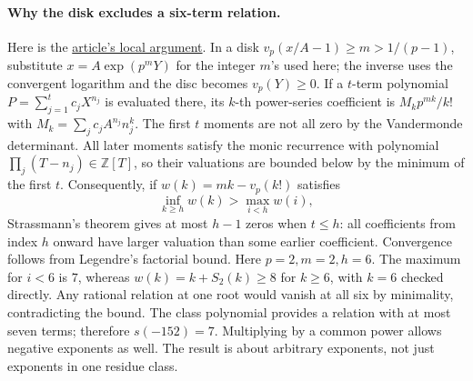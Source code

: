 \documentclass[11pt]{article}
\newcommand{\Z}{\mathbb Z}
\begin{document}
\paragraph{Why the disk excludes a six-term relation.}
Here is the \href{https://github.com/VladimirReshetnikov/ProveIt/blob/e7f7a226563fb14c6f0b796322e43b048c548953/Analysis/GeneralizedRiemannHypothesis/Article/sections/smd.tex#L64-L109}{article's local argument}.
In a disk \(v_p(x/A-1)\ge m>1/(p-1)\), substitute
\(x=A\exp(p^mY)\) for the integer \(m\)'s used here; the inverse uses
the convergent logarithm and the disc becomes \(v_p(Y)\ge0\).
If a \(t\)-term polynomial \(P=\sum_{j=1}^{t}c_jX^{n_j}\) is evaluated
there, its \(k\)-th power-series coefficient is \(M_kp^{mk}/k!\) with
\(M_k=\sum_j c_jA^{n_j}n_j^k\). The first \(t\) moments are not all
zero by the Vandermonde determinant. All later moments satisfy the
monic recurrence with polynomial \(\prod_j(T-n_j)\in\Z[T]\), so
their valuations are bounded below by the minimum of the first \(t\).
\newpage
Consequently, if \(w(k)=mk-v_p(k!)\) satisfies
\[
 \inf_{k\ge h}w(k)>\max_{i<h}w(i),
\]
Strassmann's theorem gives at most \(h-1\) zeros when \(t\le h\):
all coefficients from index \(h\) onward have larger valuation than
some earlier coefficient. Convergence follows from Legendre's
factorial bound. Here \(p=2,m=2,h=6\). The maximum for \(i<6\)
is \(7\), whereas \(w(k)=k+S_2(k)\ge8\) for \(k\ge6\), with
\(k=6\) checked directly. Any rational relation at one root would
vanish at all six by minimality, contradicting the bound. The
class polynomial provides a relation with at most seven terms;
therefore \(s(-152)=7\). Multiplying by a common power allows
negative exponents as well. The result is about arbitrary exponents,
not just exponents in one residue class.
\end{document}
